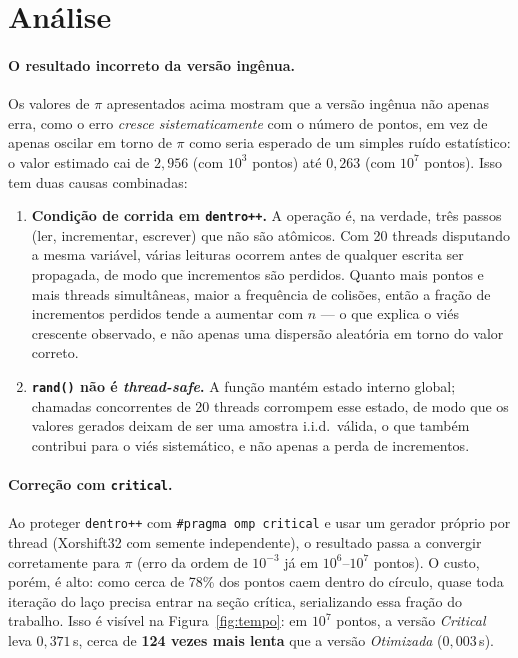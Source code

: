 \documentclass[a4paper,12pt]{article}
\begin{document}
\section{Análise}

\paragraph{O resultado incorreto da versão ingênua.} Os valores de $\pi$ apresentados acima mostram que a versão ingênua não apenas erra, como o erro \emph{cresce sistematicamente} com o número de pontos, em vez de apenas oscilar em torno de $\pi$ como seria esperado de um simples ruído estatístico: o valor estimado cai de $2{,}956$ (com $10^3$ pontos) até $0{,}263$ (com $10^7$ pontos). Isso tem duas causas combinadas:

\begin{enumerate}
    \item \textbf{Condição de corrida em \texttt{dentro++}.} A operação é, na verdade, três passos (ler, incrementar, escrever) que não são atômicos. Com 20 threads disputando a mesma variável, várias leituras ocorrem antes de qualquer escrita ser propagada, de modo que incrementos são perdidos. Quanto mais pontos e mais threads simultâneas, maior a frequência de colisões, então a fração de incrementos perdidos tende a aumentar com $n$ — o que explica o viés crescente observado, e não apenas uma dispersão aleatória em torno do valor correto.
    \item \textbf{\texttt{rand()} não é \emph{thread-safe}.} A função mantém estado interno global; chamadas concorrentes de 20 threads corrompem esse estado, de modo que os valores gerados deixam de ser uma amostra i.i.d.\ válida, o que também contribui para o viés sistemático, e não apenas a perda de incrementos.
\end{enumerate}

\paragraph{Correção com \texttt{critical}.} Ao proteger \texttt{dentro++} com \texttt{\#pragma omp critical} 
e usar um gerador próprio por thread (Xorshift32 com semente independente), o resultado passa a convergir corretamente para 
$\pi$ (erro da ordem de $10^{-3}$ já em $10^6$--$10^7$ pontos). O custo, porém, é alto: como cerca de 78\% dos pontos caem dentro do círculo, 
quase toda iteração do laço precisa entrar na seção crítica, serializando essa fração do trabalho. 
Isso é visível na Figura~\ref{fig:tempo}: em $10^7$ pontos, a versão \emph{Critical} leva $0{,}371$\,s, cerca de \textbf{124 vezes mais lenta} que a versão \emph{Otimizada} ($0{,}003$\,s).
\end{document}
